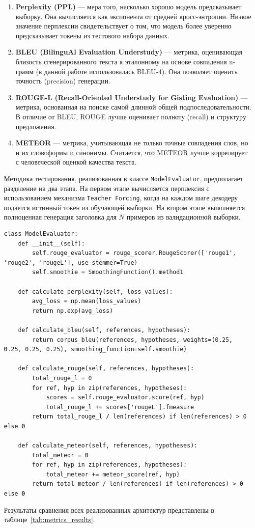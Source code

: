 \documentclass[coursework]{SCWorks}
\begin{document}
    \begin{enumerate}
        \item \textbf{Perplexity (PPL)} --- мера того, насколько хорошо модель предсказывает выборку. Она вычисляется как экспонента от средней кросс-энтропии. Низкое значение перплексии свидетельствует о том, что модель более уверенно предсказывает токены из тестового набора данных.
        \item \textbf{BLEU (BilinguAl Evaluation Understudy)} --- метрика, оценивающая близость сгенерированного текста к эталонному на основе совпадения n-грамм (в данной работе использовалась BLEU-4). Она позволяет оценить точность (precision) генерации.
        \item \textbf{ROUGE-L (Recall-Oriented Understudy for Gisting Evaluation)} --- метрика, основанная на поиске самой длинной общей подпоследовательности. В отличие от BLEU, ROUGE лучше оценивает полноту (recall) и структуру предложения.
        \item \textbf{METEOR} --- метрика, учитывающая не только точные совпадения слов, но и их словоформы и синонимы. Считается, что METEOR лучше коррелирует с человеческой оценкой качества текста.
    \end{enumerate}

    Методика тестирования, реализованная в классе \texttt{ModelEvaluator},
    предполагает разделение на два этапа.
    На первом этапе вычисляется перплексия с использованием механизма \texttt{Teacher Forcing},
    когда на каждом шаге декодеру подается истинный токен из обучающей выборки.
    На втором этапе выполняется полноценная генерация заголовка для $N$ примеров из
    валидационной выборки.

    \begin{verbatim}
class ModelEvaluator:
    def __init__(self):
        self.rouge_evaluator = rouge_scorer.RougeScorer(['rouge1', 'rouge2', 'rougeL'], use_stemmer=True)
        self.smoothie = SmoothingFunction().method1

    def calculate_perplexity(self, loss_values):
        avg_loss = np.mean(loss_values)
        return np.exp(avg_loss)

    def calculate_bleu(self, references, hypotheses):
        return corpus_bleu(references, hypotheses, weights=(0.25, 0.25, 0.25, 0.25), smoothing_function=self.smoothie)

    def calculate_rouge(self, references, hypotheses):
        total_rouge_l = 0
        for ref, hyp in zip(references, hypotheses):
            scores = self.rouge_evaluator.score(ref, hyp)
            total_rouge_l += scores['rougeL'].fmeasure
        return total_rouge_l / len(references) if len(references) > 0 else 0

    def calculate_meteor(self, references, hypotheses):
        total_meteor = 0
        for ref, hyp in zip(references, hypotheses):
            total_meteor += meteor_score(ref, hyp)
        return total_meteor / len(references) if len(references) > 0 else 0
    \end{verbatim}
    Результаты сравнения всех реализованных архитектур представлены в таблице~\ref{tab:metrics_results}.
\end{document}
